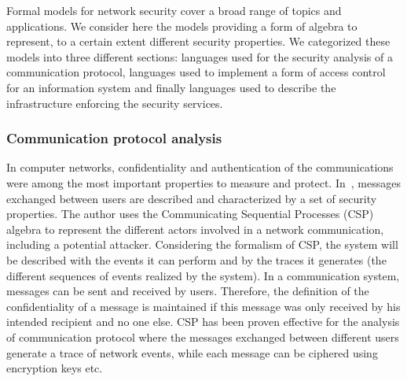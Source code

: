 Formal models for network security cover a broad range of topics and applications.
We consider here the models providing a form of algebra to represent, to a certain extent different security properties. We categorized these models into three different sections: languages used for the security analysis of a communication protocol, languages used to implement a form of access control for an information system and finally languages used to describe the infrastructure enforcing the security services.

\subsubsection{Communication protocol analysis}
In computer networks, confidentiality and authentication of the communications were among the most important properties to measure and protect.
In~\cite{CSP-Schneider1996}, messages exchanged between users are described and characterized by a set of security properties.
The author uses the Communicating Sequential Processes (CSP) algebra to represent the different actors involved in a network communication, including a potential attacker. 
Considering the formalism of CSP, the system will be described with the events it can perform and by the traces it generates (\ie the different sequences of events realized by the system).
In a communication system, messages can be sent and received by users.
Therefore, the definition of the confidentiality of a message is maintained if this message was only received by his intended recipient and no one else.
CSP has been proven effective for the analysis of communication protocol where the messages exchanged between different users generate a trace of network events, while each message can be ciphered using encryption keys etc.


